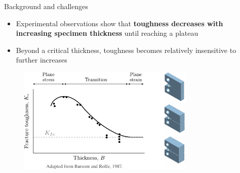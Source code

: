 \documentclass[9pt]{beamer}
\begin{document}
\begin{frame}{Background and challenges}

\begin{itemize}
    \item Experimental observations show that \textbf{toughness decreases with increasing specimen thickness} until reaching a plateau
    \vspace{0.15cm}
    \item Beyond a critical thickness, toughness becomes relatively insensitive to further increases
\end{itemize}

\begin{figure}
    \centering
    \includegraphics[width=0.75\textwidth]{Images/plateau_plane_strain.pdf}
\end{figure}


\end{frame}

\end{document}
